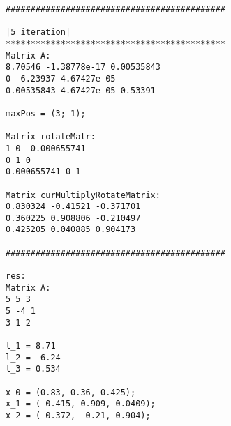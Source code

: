\begin{verbatim}
############################################

|5 iteration|
********************************************
Matrix A:
8.70546 -1.38778e-17 0.00535843 
0 -6.23937 4.67427e-05 
0.00535843 4.67427e-05 0.53391 

maxPos = (3; 1);

Matrix rotateMatr:
1 0 -0.000655741 
0 1 0 
0.000655741 0 1 

Matrix curMultiplyRotateMatrix:
0.830324 -0.41521 -0.371701 
0.360225 0.908806 -0.210497 
0.425205 0.040885 0.904173 

############################################

res:
Matrix A:
5 5 3 
5 -4 1 
3 1 2 

l_1 = 8.71
l_2 = -6.24
l_3 = 0.534

x_0 = (0.83, 0.36, 0.425);
x_1 = (-0.415, 0.909, 0.0409);
x_2 = (-0.372, -0.21, 0.904);

\end{verbatim}

\pagebreak
